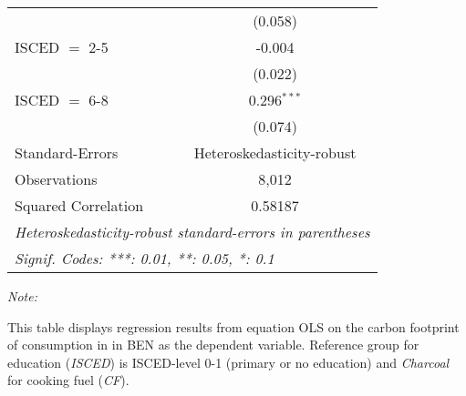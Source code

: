 \begin{table}[htbp!]
\begin{adjustbox}{width = 1\textwidth, max height = 0.95\textheight, center}
\begin{threeparttable}[b]
\begin{tabular}{lc}
                                & (0.058)\\   
            ISCED $=$ 2-5       & -0.004\\   
                                & (0.022)\\   
            ISCED $=$ 6-8       & 0.296$^{***}$\\   
                                & (0.074)\\   
            \midrule 
            Standard-Errors     & Heteroskedasticity-robust \\   
            Observations        & 8,012\\  
            Squared Correlation & 0.58187\\  
            \midrule \midrule
            \multicolumn{2}{l}{\emph{Heteroskedasticity-robust standard-errors in parentheses}}\\
            \multicolumn{2}{l}{\emph{Signif. Codes: ***: 0.01, **: 0.05, *: 0.1}}\\
         \end{tabular}
         
         \begin{tablenotes}\item \medskip \textit{Note:}
            \item This table displays regression results from equation OLS on the carbon footprint of consumption in  in BEN as the dependent variable.  Reference group for education (\textit{ISCED}) is ISCED-level 0-1 (primary or no education) and \textit{Charcoal} for cooking fuel (\textit{CF}).
         \end{tablenotes}
      \end{threeparttable}
   \end{adjustbox}
\end{table}


